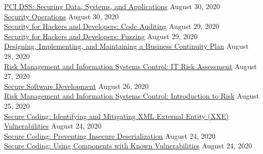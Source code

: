 \documentclass[10pt]{res} %
\begin{document}
\begin{resume}
\href{https://bjdelacruz.dev/files/certificates/pluralsight/4_PCI_DSS_Securing_Data_Systems_and_Applications.pdf}{\color{blue}PCI DSS: Securing Data, Systems, and Applications} \hfill August 30, 2020 \\
\href{https://bjdelacruz.dev/files/certificates/pluralsight/9_Security_Operations.pdf}{\color{blue}Security Operations} \hfill August 30, 2020 \\
\href{https://bjdelacruz.dev/files/certificates/pluralsight/2_Security_for_Hackers_and_Developers_Code_Auditing.pdf}{\color{blue}Security for Hackers and Developers: Code Auditing} \hfill August 29, 2020 \\
\href{https://bjdelacruz.dev/files/certificates/pluralsight/3_Security_for_Hackers_and_Developers_Fuzzing.pdf}{\color{blue}Security for Hackers and Developers: Fuzzing} \hfill August 29, 2020 \\
\href{https://bjdelacruz.dev/files/certificates/pluralsight/Designing_Implementing_and_Maintaining_a_Business_Continuity_Plan.pdf}{\color{blue}Designing, Implementing, and Maintaining a Business Continuity Plan} \hfill August 28, 2020 \\
\href{https://bjdelacruz.dev/files/certificates/pluralsight/3_Risk_Management_and_Information_Systems_Control_IT_Risk_Assessment.pdf}{\color{blue}Risk Management and Information Systems Control: IT Risk Assessment} \hfill August 27, 2020 \\
\href{https://bjdelacruz.dev/files/certificates/pluralsight/3_Secure_Software_Development.pdf}{\color{blue}Secure Software Development} \hfill August 26, 2020 \\
\href{https://bjdelacruz.dev/files/certificates/pluralsight/1_Risk_Management_and_Information_Systems_Control_Introduction_to_Risk.pdf}{\color{blue}Risk Management and Information Systems Control: Introduction to Risk} \hfill August 25, 2020 \\
\href{https://bjdelacruz.dev/files/certificates/pluralsight/8_Secure_Coding_Identifying_and_Mitigating_XML_External_Entity_XXE_Vulnerabilities.pdf}{\color{blue}Secure Coding: Identifying and Mitigating XML External Entity (XXE) Vulnerabilities} \hfill August 24, 2020 \\
\href{https://bjdelacruz.dev/files/certificates/pluralsight/10_Secure_Coding_Preventing_Insecure_Deserialization.pdf}{\color{blue}Secure Coding: Preventing Insecure Deserialization} \hfill August 24, 2020 \\
\href{https://bjdelacruz.dev/files/certificates/pluralsight/11_Secure_Coding_Using_Components_with_Known_Vulnerabilities.pdf}{\color{blue}Secure Coding: Using Components with Known Vulnerabilities} \hfill August 24, 2020 \\

\end{resume}
\end{document}
